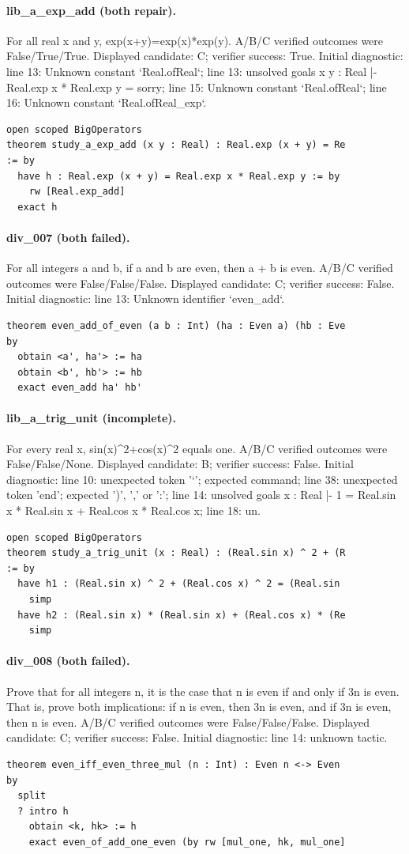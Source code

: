 \paragraph{lib\_a\_exp\_add (both repair).}
For all real x and y, exp(x+y)=exp(x)*exp(y). A/B/C verified outcomes were False/True/True.
Displayed candidate: C; verifier success: True.
Initial diagnostic: line 13: Unknown constant `Real.ofReal`; line 13: unsolved goals
x y : Real
|- Real.exp x * Real.exp y = sorry; line 15: Unknown constant `Real.ofReal`; line 16: Unknown constant `Real.ofReal\_exp`.
\begin{verbatim}
open scoped BigOperators
theorem study_a_exp_add (x y : Real) : Real.exp (x + y) = Re
:= by
  have h : Real.exp (x + y) = Real.exp x * Real.exp y := by
    rw [Real.exp_add]
  exact h
\end{verbatim}
\paragraph{div\_007 (both failed).}
For all integers a and b, if a and b are even, then a + b is even. A/B/C verified outcomes were False/False/False.
Displayed candidate: C; verifier success: False.
Initial diagnostic: line 13: Unknown identifier `even\_add`.
\begin{verbatim}
theorem even_add_of_even (a b : Int) (ha : Even a) (hb : Eve
by
  obtain <a', ha'> := ha
  obtain <b', hb'> := hb
  exact even_add ha' hb'
\end{verbatim}
\paragraph{lib\_a\_trig\_unit (incomplete).}
For every real x, sin(x)\textasciicircum{}2+cos(x)\textasciicircum{}2 equals one. A/B/C verified outcomes were False/False/None.
Displayed candidate: B; verifier success: False.
Initial diagnostic: line 10: unexpected token '`'; expected command; line 38: unexpected token 'end'; expected ')', ',' or ':'; line 14: unsolved goals
x : Real
|- 1 = Real.sin x * Real.sin x + Real.cos x * Real.cos x; line 18: un.
\begin{verbatim}
open scoped BigOperators
theorem study_a_trig_unit (x : Real) : (Real.sin x) ^ 2 + (R
:= by
  have h1 : (Real.sin x) ^ 2 + (Real.cos x) ^ 2 = (Real.sin 
    simp
  have h2 : (Real.sin x) * (Real.sin x) + (Real.cos x) * (Re
    simp
\end{verbatim}
\paragraph{div\_008 (both failed).}
Prove that for all integers n, it is the case that n is even if and only if 3n is even. That is, prove both implications: if n is even, then 3n is even, and if 3n is even, then n is even. A/B/C verified outcomes were False/False/False.
Displayed candidate: C; verifier success: False.
Initial diagnostic: line 14: unknown tactic.
\begin{verbatim}
theorem even_iff_even_three_mul (n : Int) : Even n <-> Even 
by
  split
  ? intro h
    obtain <k, hk> := h
    exact even_of_add_one_even (by rw [mul_one, hk, mul_one]

\end{verbatim}
